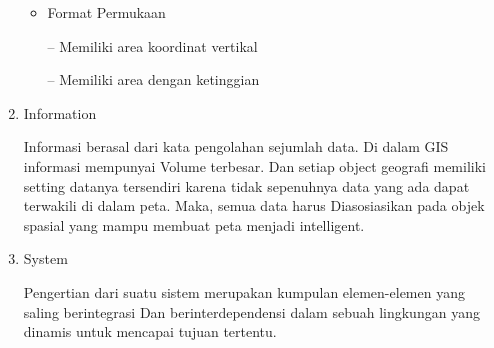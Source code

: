 \begin{enumerate}
\begin{itemize} 
\item Format Permukaan
\end{itemize}

\begin{itemize}
\item[--] Memiliki area koordinat vertikal
\item[--] Memiliki area dengan ketinggian
\end{itemize}


\item Information

Informasi berasal dari kata pengolahan sejumlah data. Di dalam GIS informasi mempunyai
Volume terbesar. Dan setiap object geografi memiliki setting datanya tersendiri karena 
tidak sepenuhnya data yang ada dapat terwakili di dalam peta. Maka, semua data harus
Diasosiasikan pada objek spasial yang mampu membuat peta menjadi intelligent.


\item System

Pengertian dari suatu sistem merupakan kumpulan elemen-elemen yang saling berintegrasi 
Dan berinterdependensi dalam sebuah lingkungan yang dinamis untuk mencapai tujuan tertentu.
\end{enumerate}


